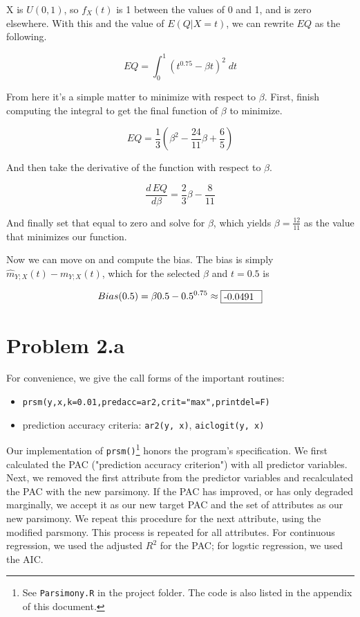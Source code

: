 \documentclass[letter]{article}
\newcounter{foot}
\begin{document}
X is $U(0,1)$, so $f_X(t)$ is 1 between the values of 0 and 1, and is zero elsewhere. With this and the value of $E(Q | X = t)$, we can rewrite $EQ$ as the following.

\begin{equation}
	EQ = \int _0 ^1 (t^{0.75} - \beta t)^2 \; dt
\end{equation}

From here it's a simple matter to minimize with respect to $\beta$. First, finish computing the integral to get the final function of $\beta$ to minimize.

\begin{equation}
	EQ = \frac{1}{3}(\beta^2 - \frac{24}{11}\beta + \frac{6}{5})
\end{equation}

And then take the derivative of the function with respect to $\beta$.

\begin{equation}
	\frac{d\,EQ}{d\beta} = \frac{2}{3}\beta - \frac{8}{11}
\end{equation}

And finally set that equal to zero and solve for $\beta$, which yields $\beta=\frac{12}{11}$ as the value that minimizes our function.

Now we can move on and compute the bias. The bias is simply $\hat{m}_{Y;X}(t) - m_{Y;X}(t)$, which for the selected $\beta$ and $t=0.5$ is

\begin{equation}
	Bias(0.5) = \beta 0.5 - 0.5^{0.75} \approx {\fbox {\parbox{0.5in}{-0.0491}}}
\end{equation}


\section{Problem 2.a}

For convenience, we give the call forms of the important routines:
\begin{itemize}
  \item \texttt{prsm(y,x,k=0.01,predacc=ar2,crit="max",printdel=F)} 
  \item prediction accuracy criteria: \texttt{ar2(y, x)}, \texttt{aiclogit(y, x)}
\end{itemize}

Our implementation of \texttt{prsm()}\footnote{See \texttt{Parsimony.R} in the project folder.
The code is also listed in the appendix of this document.} 
honors the program's specification. We first calculated the PAC ("prediction accuracy criterion")
with all predictor variables. Next, we removed the first attribute from the predictor variables 
and recalculated the PAC with the new parsimony. If the PAC has improved, or has only degraded 
marginally, we accept it as our new target PAC and the set of attributes as our new parsimony.
We repeat this procedure for the next attribute, using the modified parsmony. This process is 
repeated for all attributes. For continuous regression, we used the adjusted $R^2$ for the PAC; 
for logstic regression, we used the AIC.
\end{document}
